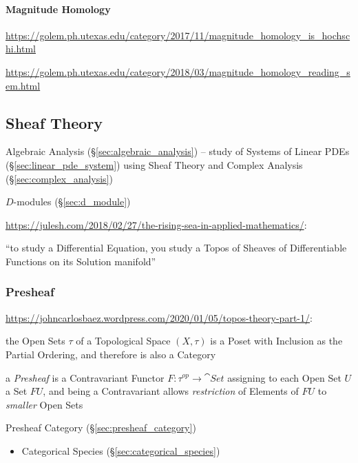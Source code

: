 \paragraph{Magnitude Homology}\label{sec:magnitude_homology}\hfill

\url{https://golem.ph.utexas.edu/category/2017/11/magnitude_homology_is_hochschi.html}

\url{https://golem.ph.utexas.edu/category/2018/03/magnitude_homology_reading_sem.html}



\subsection{Sheaf Theory}\label{sec:sheaf_theory}

\fist Algebraic Analysis (\S\ref{sec:algebraic_analysis}) -- study of Systems of
Linear PDEs (\S\ref{sec:linear_pde_system}) using Sheaf Theory and Complex
Analysis (\S\ref{sec:complex_analysis})

\fist $D$-modules (\S\ref{sec:d_module})

\url{https://julesh.com/2018/02/27/the-rising-sea-in-applied-mathematics/}:

``to study a Differential Equation, you study a Topos of Sheaves of
Differentiable Functions on its Solution manifold''



\subsubsection{Presheaf}\label{sec:presheaf}

\url{https://johncarlosbaez.wordpress.com/2020/01/05/topos-theory-part-1/}:

the Open Sets $\tau$ of a Topological Space $(X, \tau)$ is a Poset with
Inclusion as the Partial Ordering, and therefore is also a Category

a \emph{Presheaf} is a Contravariant Functor $F : \tau^{op} \rightarrow
\cat{Set}$ assigning to each Open Set $U$ a Set $F U$, and being a Contravariant
allows \emph{restriction} of Elements of $F U$ to \emph{smaller} Open Sets

Presheaf Category (\S\ref{sec:presheaf_category})

\begin{itemize}
  \item Categorical Species (\S\ref{sec:categorical_species})
\end{itemize}



